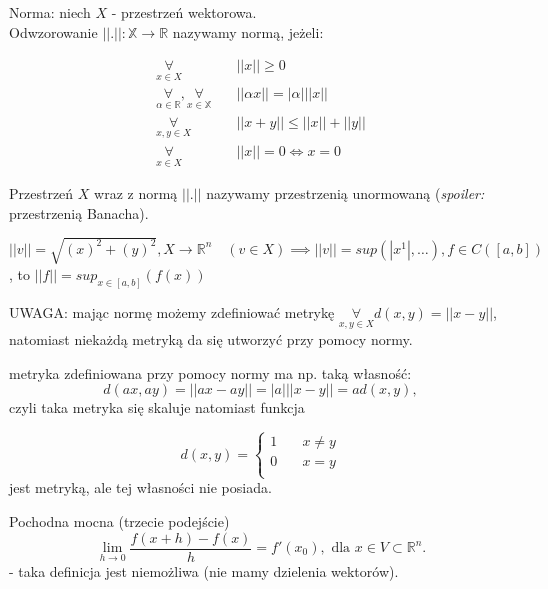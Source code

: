 \documentclass[../main.tex]{subfiles}
\begin{document}
\begin{definicja}
Norma: niech $X$ - przestrzeń wektorowa.\\
Odwzorowanie $||.||: \mathbb{X}\to \mathbb{R}$ nazywamy normą, jeżeli:
\end{definicja}

\begin{align}
    \underset{x\in X}{\forall} \quad &||x|| \geq 0\\
    \underset{\alpha\in\mathbb{R}}{\forall}, \underset{x\in \mathbb{X}}{\forall} \quad &|| \alpha x|| = |\alpha| ||x||\\
    \underset{x,y \in X}{\forall} \quad &||x+y|| \leq ||x|| + ||y||\\
    \underset{x\in X}{\forall} \quad &||x|| = 0 \iff x = 0
\end{align}

Przestrzeń $X$ wraz z normą $||.||$ nazywamy przestrzenią unormowaną (\textit{spoiler:} przestrzenią Banacha).

\begin{przyklad}
\end{przyklad}

$||v|| = \sqrt{(x)^2 + (y)^2}, X \to \mathbb{R}^{n} \quad (v\in X)\implies||v|| = sup(|x^1|,\dots), f\in C([a,b])$, to $||f|| = sup_{x\in{[a,b]}} (f(x))$

\vspace{0.3cm}
UWAGA: mając normę możemy zdefiniować metrykę $\underset{x,y\in X}{\forall} d(x,y) = ||x-y||$, natomiast niekażdą metryką da się utworzyć przy pomocy normy.
\vspace{0.3cm}

\begin{przyklad}
    metryka zdefiniowana przy pomocy normy ma np. taką własność: $$d(ax,ay) = ||ax - ay|| = |a| ||x-y|| = a d(x,y),$$ czyli taka metryka się skaluje natomiast funkcja
\end{przyklad}

\[ d(x,y) =
\begin{cases}
    1 & \quad x\neq y\\
    0 & \quad x=y\\
\end{cases}
\]  jest metryką, ale tej własności nie posiada.

\begin{definicja}
    Pochodna mocna (trzecie podejście)
\[
 \lim\limits_{h \to 0}\frac{f(x+h) - f(x)}{h} = f'(x_0), \text{ dla }x\in V\subset \mathbb{R}^{n}
 .\]
 - taka definicja jest niemożliwa (nie mamy dzielenia wektorów).
\end{definicja}
\end{document}
